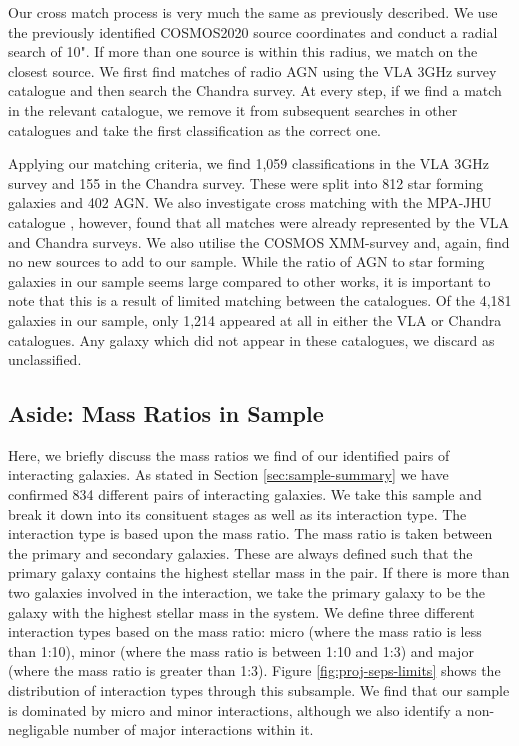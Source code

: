 Our cross match process is very much the same as previously described. We use the previously identified COSMOS2020 source coordinates and conduct a radial search of 10". If more than one source is within this radius, we match on the closest source. We first find matches of radio AGN using the VLA 3GHz survey catalogue and then search the Chandra survey. At every step, if we find a match in the relevant catalogue, we remove it from subsequent searches in other catalogues and take the first classification as the correct one.

Applying our matching criteria, we find 1,059 classifications in the VLA 3GHz survey and 155 in the Chandra survey. These were split into 812 star forming galaxies and 402 AGN. We also investigate cross matching with the MPA-JHU catalogue \citep{2003MNRAS.341...33K, 2004MNRAS.351.1151B, 2007ApJS..173..267S}, however, found that all matches were already represented by the VLA and Chandra surveys. We also utilise the COSMOS XMM-survey and, again, find no new sources to add to our sample. While the ratio of AGN to star forming galaxies in our sample seems large compared to other works, it is important to note that this is a result of limited matching between the catalogues. Of the 4,181 galaxies in our sample, only 1,214 appeared at all in either the VLA or Chandra catalogues. Any galaxy which did not appear in these catalogues, we discard as unclassified. 

\subsection{Aside: Mass Ratios in Sample}
Here, we briefly discuss the mass ratios we find of our identified pairs of interacting galaxies. As stated in Section \ref{sec:sample-summary} we have confirmed 834 different pairs of interacting galaxies. We take this sample and break it down into its consituent stages as well as its interaction type. The interaction type is based upon the mass ratio. The mass ratio is taken between the primary and secondary galaxies. These are always defined such that the primary galaxy contains the highest stellar mass in the pair. If there is more than two galaxies involved in the interaction, we take the primary galaxy to be the galaxy with the highest stellar mass in the system. We define three different interaction types based on the mass ratio: micro (where the mass ratio is less than 1:10), minor (where the mass ratio is between 1:10 and 1:3) and major (where the mass ratio is greater than 1:3). Figure \ref{fig:proj-seps-limits} shows the distribution of interaction types through this subsample. We find that our sample is dominated by micro and minor interactions, although we also identify a non-negligable number of major interactions within it.

